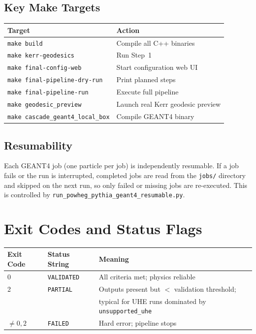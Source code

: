 \documentclass[11pt,a4paper]{article}
\begin{document}
\subsection{Key Make Targets}

\begin{center}
\begin{tabular}{ll}
\toprule
Target & Action \\
\midrule
\texttt{make build} & Compile all C++ binaries \\
\texttt{make kerr-geodesics} & Run Step~1 \\
\texttt{make final-config-web} & Start configuration web UI \\
\texttt{make final-pipeline-dry-run} & Print planned steps \\
\texttt{make final-pipeline-run} & Execute full pipeline \\
\texttt{make geodesic\_preview} & Launch real Kerr geodesic preview \\
\texttt{make cascade\_geant4\_local\_box} & Compile GEANT4 binary \\
\bottomrule
\end{tabular}
\end{center}

\subsection{Resumability}

Each GEANT4 job (one particle per job) is independently resumable. If a job fails or the run is interrupted, completed jobs are read from the \texttt{jobs/} directory and skipped on the next run, so only failed or missing jobs are re-executed. This is controlled by \texttt{run\_powheg\_pythia\_geant4\_resumable.py}.

\section{Exit Codes and Status Flags}
\label{sec:status}

\begin{center}
\begin{tabular}{lll}
\toprule
Exit Code & Status String & Meaning \\
\midrule
0 & \texttt{VALIDATED} & All criteria met; physics reliable \\
2 & \texttt{PARTIAL} & Outputs present but $<$ validation threshold; \\
  &                   & typical for UHE runs dominated by \texttt{unsupported\_uhe} \\
$\neq 0,2$ & \texttt{FAILED} & Hard error; pipeline stops \\
\bottomrule
\end{tabular}
\end{center}
\end{document}
